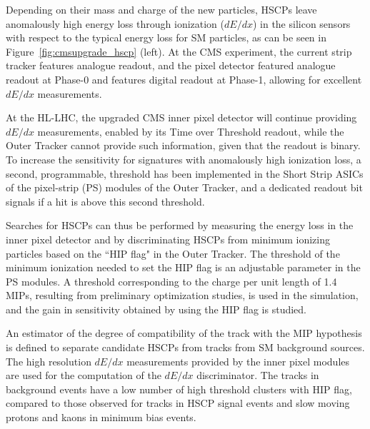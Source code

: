 Depending on their mass and charge of the new particles, HSCPs leave anomalously high energy loss through ionization ($dE/dx$) in the silicon sensors with respect to the typical energy loss for SM particles, as can be seen in Figure~\ref{fig:cmsupgrade_hscp} (left).
At the CMS experiment, the current strip tracker features analogue readout, and the pixel detector featured analogue
readout at Phase-0 and features digital readout at Phase-1, allowing for excellent $dE/dx$ measurements.

At the HL-LHC, the upgraded CMS inner pixel detector will continue providing $dE/dx$ measurements, enabled
by its Time over Threshold readout, while the Outer Tracker cannot provide such information, given that the readout is binary. 
To increase the sensitivity for signatures with anomalously high ionization loss, a second, programmable, threshold has been implemented in the Short
Strip ASICs of the pixel-strip (PS) modules of the Outer Tracker, and a dedicated readout bit signals if a
hit is above this second threshold.  

Searches for HSCPs can thus be performed by measuring the energy loss in the inner pixel detector and by
discriminating HSCPs from minimum ionizing particles based on the ``HIP flag" in the Outer
Tracker. The threshold of the minimum ionization needed to set the HIP flag is an adjustable
parameter in the PS modules. A threshold corresponding to the charge per unit length of 1.4
MIPs, resulting from preliminary optimization studies, is used in the simulation, and the gain
in sensitivity obtained by using the HIP flag is studied.

An estimator of the degree of compatibility of the track with the MIP hypothesis is defined
to separate candidate HSCPs from tracks from SM background sources. The high resolution
$dE/dx$ measurements provided by the inner pixel modules are used for the computation of
the $dE/dx$ discriminator. 
The tracks in background events have a low number of high threshold clusters with HIP flag, compared to those observed for
tracks in HSCP signal events and slow moving protons and kaons in minimum bias events.

